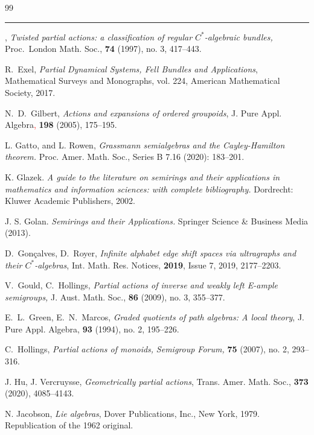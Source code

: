 \documentclass{amsart}
\newcommand{\0}{{\vartheta}}
\theoremstyle{definition}
\theoremstyle{remark}
\numberwithin{equation}{section}
\newtheorem*{Theorem A}{\textbf{Theorem A}}
\newtheorem*{Corollary E}{\textbf{Corollary E}}
\newtheorem*{Corollary F}{\textbf{Corollary F}}
\newtheorem*{Theorem B}{\textbf{Theorem B}}
\newtheorem*{Theorem C}{\textbf{Theorem C}}
\newtheorem*{Theorem D}{\textbf{Theorem B}}
\newtheorem*{p a}{\textbf{Proof of  Theorem A}}
\newtheorem*{p b}{\textbf{Proof of Theorem B}}
\newtheorem*{p c}{\textbf{Proof of  Theorem C}}
\newtheorem*{p d}{\textbf{Proof of  Theorem D}}
\begin{document}
\begin{thebibliography}{99}
\rule{11mm}{0.1mm}, {\em Twisted partial actions: a classification of regular
$C^*$-algebraic bundles,}  Proc.\ London Math. Soc., {\bf 74}   (1997), no. 3, 417--443.




 R.\ Exel, {\it Partial Dynamical Systems, Fell Bundles and Applications}, Mathematical Surveys and Monographs, vol. 224, American Mathematical Society, 2017.

 N.\ D.\ Gilbert, {\em Actions and expansions of ordered groupoids},  J. Pure Appl. Algebra\textcolor{red}{,} {\bf 198}
(2005), 175--195.

 L. Gatto, and L. Rowen, {\em Grassmann semialgebras and the Cayley-Hamilton theorem.} Proc.  Amer. Math. Soc., Series B 7.16 (2020): 183--201.

 K. Glazek. {\em A guide to the literature on semirings and their applications in mathematics and information sciences: with complete bibliography.} Dordrecht: Kluwer Academic Publishers, 2002.

 J. S. Golan. {\em Semirings and their Applications.} Springer Science \& Business Media (2013).

  D.\ Gon\c calves, D.\ Royer,  {\em Infinite alphabet edge shift spaces via ultragraphs and 
their $C^*$-algebras}, 
 Int. Math. Res. Notices, {\bf 2019}, Issue 7,  2019,  2177--2203. 

 V.\ Gould, C.\  Hollings,  {\em Partial actions of inverse and weakly left E-ample semigroups,} 
 J.  Aust. Math. Soc., {\bf 86}  (2009), no. 3,  355--377.

 E.\ L.\ Green, E.\ N.\  Marcos, 
{\em Graded quotients of path algebras: A local theory},
 J. Pure Appl. Algebra, {\bf 93}  (1994), no. 2, 195--226.
 
 
 C.\ Hollings,  {\em Partial actions of monoids,} {\it Semigroup Forum,} {\bf 75} (2007), no. 2, 293--316. 

   J. Hu, J. Vercruysse, {\em Geometrically partial actions}, 	 Trans. Amer. Math.
Soc., {\bf 373} (2020), 4085--4143.  

 N. Jacobson, {\em Lie algebras}, Dover Publications, Inc., New York, 1979. Republication of the 1962
original.


\end{thebibliography}
\end{document}
